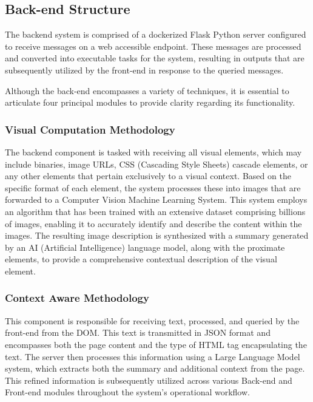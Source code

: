 \documentclass[conference]{IEEEtran}
\begin{document}
\subsection{Back-end Structure}

The backend system is comprised of a dockerized Flask Python server configured to receive messages on a web accessible endpoint. These messages are processed and converted into executable tasks for the system, resulting in outputs that are subsequently utilized by the front-end in response to the queried messages. 

Although the back-end encompasses a variety of techniques, it is essential to articulate four principal modules to provide clarity regarding its functionality.

\subsubsection{Visual Computation Methodology}

The backend component is tasked with receiving all visual elements, which may include binaries, image URLs, CSS (Cascading Style Sheets) cascade elements, or any other elements that pertain exclusively to a visual context. Based on the specific format of each element, the system processes these into images that are forwarded to a Computer Vision Machine Learning System. This system employs an algorithm that has been trained with an extensive dataset comprising billions of images, enabling it to accurately identify and describe the content within the images. The resulting image description is synthesized with a summary generated by an AI (Artificial Intelligence) language model, along with the proximate elements, to provide a comprehensive contextual description of the visual element.

\subsubsection{Context Aware Methodology}

This component is responsible for receiving text, processed, and queried by the front-end from the DOM. This text is transmitted in JSON format and encompasses both the page content and the type of HTML tag encapsulating the text. The server then processes this information using a Large Language Model system, which extracts both the summary and additional context from the page. This refined information is subsequently utilized across various Back-end and Front-end modules throughout the system's operational workflow.
\end{document}

